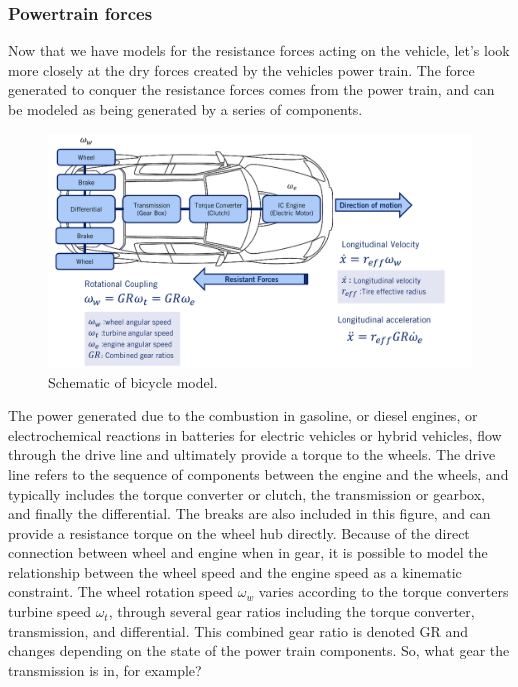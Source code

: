 \subsubsection{Powertrain forces}

Now that we have models for the resistance forces acting on the vehicle, let's look more closely at the dry forces created by the vehicles power train. The force generated to conquer the resistance forces comes from the power train, and can be modeled as being generated by a series of components. 

\begin{figure}[!htb]
\begin{center}
\includegraphics[scale=0.290]{img/longitudinal_model/longitudinal_model_2.jpeg}
\end{center}
\caption{Schematic of bicycle model.}
\label{longitudinal_model_2}
\end{figure}

The power generated due to the combustion in gasoline, or diesel engines, or electrochemical reactions in batteries for electric vehicles or hybrid vehicles, flow through the drive line and ultimately provide a torque to the wheels. The drive line refers to the sequence of components between the engine and the wheels, and typically includes the torque converter or clutch, the transmission or gearbox, and finally the differential. The breaks are also included in this figure, and can provide a resistance torque on the wheel hub directly. Because of the direct connection between wheel and engine when in gear, it is possible to model the relationship between the wheel speed and the engine speed as a kinematic constraint. The wheel rotation speed $\omega_w$ varies according to 
the torque converters turbine speed $\omega_t$, through several gear ratios including the torque converter, transmission, and differential. This combined gear ratio is denoted GR and changes depending on the state of the power train components. So, what gear the transmission is in, for example? 

